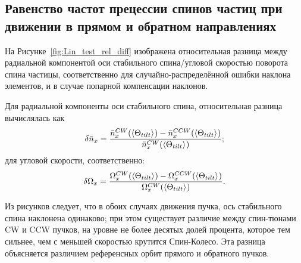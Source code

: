 \subsection{Равенство частот прецессии спинов частиц при движении в прямом и обратном направлениях}\label{chpt3:imperfections:CW_vs_CCW}
На Рисунке~\ref{fig:Lin_test_rel_diff} изображена относительная разница между радиальной компонентой оси стабильного спина/угловой скоростью поворота спина частицы, соответственно для случайно-распределённой ошибки наклона элементов, и в случае попарной компенсации наклонов.

Для радиальной компоненты оси стабильного спина, относительная разница вычислялась как 
\[
\delta\bar n_x = \frac{\bar n_x^{CW}(\avg{\Theta_{tilt}}) - \bar n_x^{CCW}(\avg{\Theta_{tilt}})}{\bar n_x^{CW}(\avg{\Theta_{tilt}})};
\]
для угловой скорости, соответственно:
\[
\delta\W_x = \frac{\W_x^{CW}(\avg{\Theta_{tilt}}) - \W_x^{CCW}(\avg{\Theta_{tilt}})}{\W_x^{CW}(\avg{\Theta_{tilt}})}.
\]

Из рисунков следует, что в обоих случаях движения пучка, ось стабильного спина наклонена одинаково; при этом существует различие между спин-тюнами CW и CCW пучков, на уровне не более десятых долей процента, которое тем сильнее, чем с меньшей скоростью крутится Спин-Колесо. Эта разница объясняется различием референсных орбит прямого и обратного пучков. 

